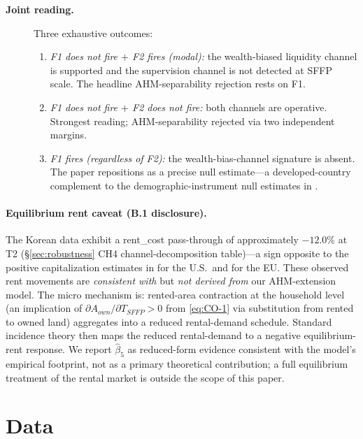 \documentclass[12pt, a4paper]{article}
\begin{document}
\begin{description}
\item[\textbf{Joint reading.}] Three exhaustive outcomes:
\begin{enumerate}
\item \emph{F1 does not fire $+$ F2 fires (modal):} the wealth-biased liquidity channel is supported and the supervision channel is not detected at SFFP scale. The headline AHM-separability rejection rests on F1.
\item \emph{F1 does not fire $+$ F2 does not fire:} both channels are operative. Strongest reading; AHM-separability rejected via two independent margins.
\item \emph{F1 fires (regardless of F2):} the wealth-bias-channel signature is absent. The paper repositions as a precise null estimate---a developed-country complement to the demographic-instrument null estimates in \citet{LaFaveThomas2016_markets}.
\end{enumerate}
\end{description}

\paragraph{Equilibrium rent caveat (B.1 disclosure).} The Korean data exhibit a rent\_cost pass-through of approximately $-12.0\%$ at T2 (\S\ref{sec:robustness} CH4 channel-decomposition table)---a sign opposite to the positive capitalization estimates in \citet{Kirwan2009_rentcap} for the U.S.\ and \citet{BaldoniCiaian2023_eucap} for the EU. These observed rent movements are \emph{consistent with} but \emph{not derived from} our AHM-extension model. The micro mechanism is: rented-area contraction at the household level (an implication of $\partial A_{own}/\partial T_{SFFP} > 0$ from \ref{eq:CO-1} via substitution from rented to owned land) aggregates into a reduced rental-demand schedule. Standard incidence theory \citep{Floyd1965_incidence, AlstonJames2002_incidence} then maps the reduced rental-demand to a negative equilibrium-rent response. We report $\hat\beta_5$ as reduced-form evidence consistent with the model's empirical footprint, not as a primary theoretical contribution; a full equilibrium treatment of the rental market is outside the scope of this paper.

\section{Data}
\label{sec:data}
\end{document}
